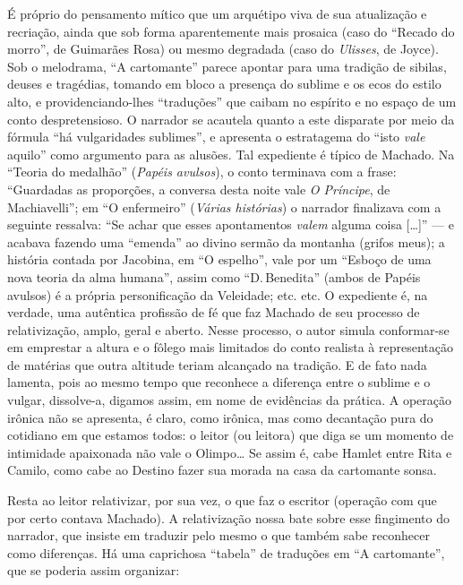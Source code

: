 É próprio do pensamento mítico que um arquétipo viva de sua atualização
e recriação, ainda que sob forma aparentemente mais prosaica (caso do
``Recado do morro'', de Guimarães Rosa) ou mesmo degradada (caso do
\emph{Ulisses}, de Joyce). Sob o melodrama, ``A cartomante'' parece
apontar para uma tradição de sibilas, deuses e tragédias, tomando em
bloco a presença do sublime e os ecos do estilo alto, e
providenciando-lhes ``traduções'' que caibam no espírito e no espaço de
um conto despretensioso. O narrador se acautela quanto a este disparate
por meio da fórmula ``há vulgaridades sublimes'', e apresenta o
estratagema do ``isto \emph{vale} aquilo'' como argumento para as
alusões. Tal expediente é típico de Machado. Na ``Teoria do medalhão''
(\emph{Papéis avulsos}), o conto terminava com a frase: ``Guardadas as
proporções, a conversa desta noite vale \emph{O Príncipe}, de
Machiavelli''; em ``O enfermeiro'' (\emph{Várias histórias}) o narrador
finalizava com a seguinte ressalva: ``Se achar que esses apontamentos
\emph{valem} alguma coisa {[}\ldots{}{]}'' --- e acabava fazendo uma
``emenda'' ao divino sermão da montanha (grifos meus); a história
contada por Jacobina, em ``O espelho'', vale por um ``Esboço de uma nova
teoria da alma humana'', assim como ``D.\,Benedita'' (ambos de Papéis
avulsos) é a própria personificação da Veleidade; etc. etc. O expediente
é, na verdade, uma autêntica profissão de fé que faz Machado de seu
processo de relativização, amplo, geral e aberto. Nesse processo, o
autor simula conformar-se em emprestar a altura e o fôlego mais
limitados do conto realista à representação de matérias que outra
altitude teriam alcançado na tradição. E de fato nada lamenta, pois ao
mesmo tempo que reconhece a diferença entre o sublime e o vulgar,
dissolve-a, digamos assim, em nome de evidências da prática. A operação
irônica não se apresenta, é claro, como irônica, mas como decantação
pura do cotidiano em que estamos todos: o leitor (ou leitora) que diga
se um momento de intimidade apaixonada não vale o Olimpo\ldots{} Se
assim é, cabe Hamlet entre Rita e Camilo, como cabe ao Destino fazer sua
morada na casa da cartomante sonsa.

Resta ao leitor relativizar, por sua vez, o que faz o escritor (operação
com que por certo contava Machado). A relativização nossa bate sobre
esse fingimento do narrador, que insiste em traduzir pelo mesmo o que
também sabe reconhecer como diferenças. Há uma caprichosa ``tabela'' de
traduções em ``A cartomante'', que se poderia assim organizar:

